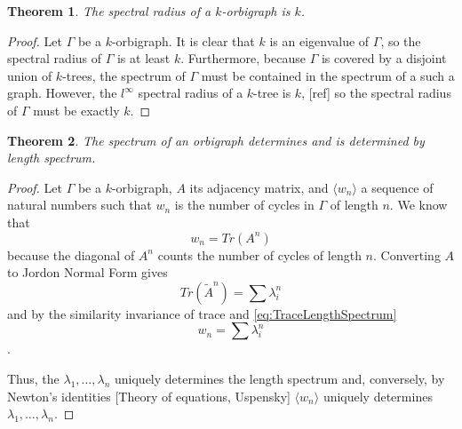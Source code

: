 \documentclass[12pt]{article}
\theoremstyle{plain}
\newtheorem{theorem}{Theorem}
\theoremstyle{definition}
\theoremstyle{remark}
\begin{document}
    \begin{theorem}\label{thm:SpectralRadius}
      The spectral radius of a $k$-orbigraph is $k$.
    \end{theorem}
    \begin{proof}
      Let $\Gamma$ be a $k$-orbigraph. It is clear that $k$ is an eigenvalue of $\Gamma$, so the spectral radius of $\Gamma$ is at least $k$. Furthermore, because $\Gamma$ is covered by a disjoint union of $k$-trees, the spectrum of $\Gamma$ must be contained in the spectrum of a such a graph. However, the $l^\infty$ spectral radius of a $k$-tree is $k$, [ref] so the spectral radius of $\Gamma$ must be exactly $k$. %
    \end{proof}

    \begin{theorem}\label{thm:LengthSpectrum}
      The spectrum of an orbigraph determines and is determined by length spectrum.
    \end{theorem}
    \begin{proof}
      Let $\Gamma$ be a $k$-orbigraph, $A$ its adjacency matrix, and $\langle w_n \rangle$ a sequence of natural numbers such that $w_n$ is the number of cycles in $\Gamma$ of length $n$. We know that
        \begin{equation}\label{eq:TraceLengthSpectrum}
          w_n = Tr(A^n)
        \end{equation}
      because the diagonal of $A^n$ counts the number of cycles of length $n$. Converting $A$ to Jordon Normal Form gives
      \begin{equation*}
        Tr(\tilde{A}^n) = \sum \lambda_i^n
      \end{equation*}
      and by the similarity invariance of trace and \ref{eq:TraceLengthSpectrum}
      \begin{equation*}
        w_n = \sum \lambda_i^n
      \end{equation*}.

      Thus, the $\lambda_1, \ldots, \lambda_n$ uniquely determines the length spectrum and, conversely, by Newton's identities [Theory of equations, Uspensky] $\langle w_n \rangle$ uniquely determines $\lambda_1, \ldots, \lambda_n$.

    \end{proof}
\end{document}
